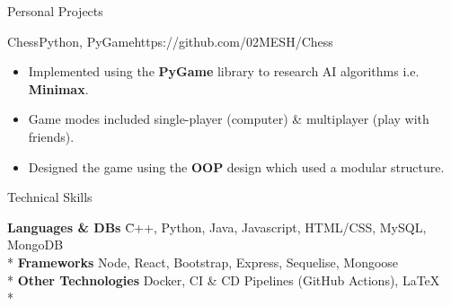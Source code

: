 \documentclass[11pt]{article}
\newlength{\secsep}
\newlength{\seperate}
\newcommand{\coloredhrulefill}[2][black]{%
    \leavevmode%
    \leaders\hbox{\textcolor{#1}{\rule{1ex}{0.5pt}}}\hfill\kern0pt%
}
\newcommand{\lineunder}{\vspace*{-24pt} \hspace*{-6pt} \coloredhrulefill[contactgrey]{}  \\* \vspace*{-15pt}}
\newenvironment{tabbedList}[1]{
	\begin{list}{}{
      \setlength{\itemsep}{0pt}
      \setlength{\labelsep}{0pt}
      \setlength{\labelwidth}{0pt}
      \setlength{\leftmargin}{10pt}
      \setlength{\rightmargin}{0pt}
      \setlength{\listparindent}{0pt}
      \setlength{\parsep}{0pt}
      \setlength{\parskip}{0pt}
      \setlength{\partopsep}{0pt}
      \setlength{\topsep}{#1}
	}
	\item[]
}{\end{list}}
\newenvironment{notabbedList}{
	\begin{tabbing}
}{\end{tabbing}\vspace{-1.2em}}
\newenvironment{resume_section}[1] {
	\textsc{\Large #1} \\*
	
	\lineunder
	\begin{tabbedList}{\secsep}
}{\end{tabbedList}\vspace{1.2\secsep}}
\newenvironment{personal_projects}[4] {
	\textbf{#1} \href{#4}{#3} $\mid$ {\scriptsize #2}  %
	\vspace*{4px}
	\begin{tabbedList}{0pt}
}{\end{tabbedList}\vspace*{1.5\secsep}}
\newenvironment{subitems}{
	\vspace*{-2px}
	\begin{itemize}[left=2pt]
		\setlength{\labelsep}{0.3em}
		\setlength{\itemsep}{0pt}
		\setlength{\parsep}{0pt}
		\setlength{\topsep}{0px}
}{\end{itemize}}
\begin{document}
\begin{resume_section}{Personal Projects}
		\vspace*{\seperate}	
	
		\begin{personal_projects} {Chess}{Python, PyGame}{\faGithub}{https://github.com/02MESH/Chess}
			\begin{subitems}
				\item{Implemented using the \textbf{PyGame} library to research AI algorithms i.e. \textbf{Minimax}.}
				\item{Game modes included single-player (computer) \& multiplayer (play with friends).}
				\item{Designed the game using the \textbf{OOP} design which used a modular structure.}
			\end{subitems}
		\end{personal_projects}
		
	\end{resume_section}
		\begin{resume_section}{Technical Skills}
		\begin{notabbedList}
			\textbf{Languages \& DBs} \hspace*{5pt} \= C++, Python, Java, Javascript, HTML/CSS, MySQL, MongoDB \\*
			\textbf{Frameworks} \> Node, React, Bootstrap,  Express, Sequelise, Mongoose\\*
			\textbf{Other Technologies} \> Docker, CI \& CD Pipelines (GitHub Actions), \LaTeX\\*
		\end{notabbedList}
	\end{resume_section}
\end{document}
